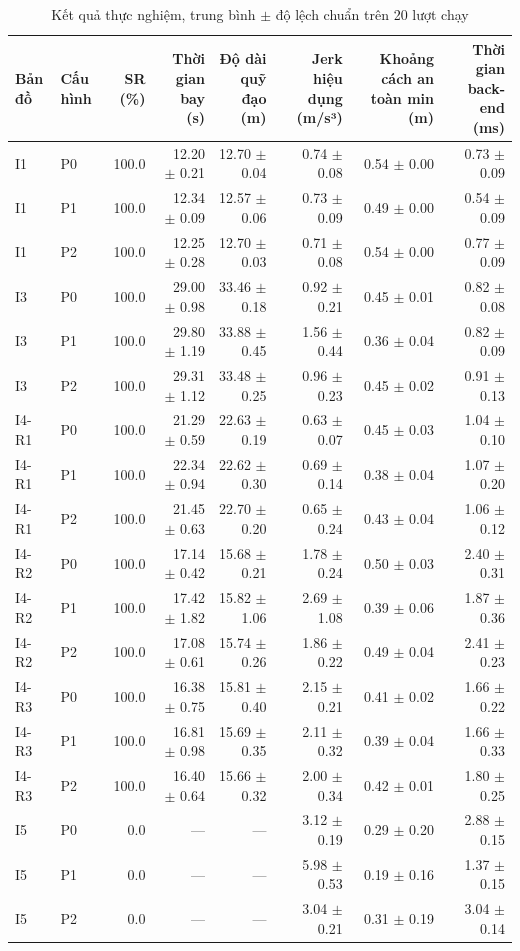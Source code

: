 \begin{table}[htbp]
\centering
\caption{Kết quả thực nghiệm, trung bình $\pm$ độ lệch chuẩn trên 20 lượt chạy}
\label{tab:ket-qua}
\begin{tabular}{llrrrrrr}
\hline
Bản đồ & Cấu hình & SR (\%) & Thời gian bay (s) & Độ dài quỹ đạo (m) & Jerk hiệu dụng (m/s³) & Khoảng cách an toàn min (m) & Thời gian back-end (ms) \\
\hline
I1 & P0 & 100.0 & 12.20 $\pm$ 0.21 & 12.70 $\pm$ 0.04 & 0.74 $\pm$ 0.08 & 0.54 $\pm$ 0.00 & 0.73 $\pm$ 0.09 \\
I1 & P1 & 100.0 & 12.34 $\pm$ 0.09 & 12.57 $\pm$ 0.06 & 0.73 $\pm$ 0.09 & 0.49 $\pm$ 0.00 & 0.54 $\pm$ 0.09 \\
I1 & P2 & 100.0 & 12.25 $\pm$ 0.28 & 12.70 $\pm$ 0.03 & 0.71 $\pm$ 0.08 & 0.54 $\pm$ 0.00 & 0.77 $\pm$ 0.09 \\
I3 & P0 & 100.0 & 29.00 $\pm$ 0.98 & 33.46 $\pm$ 0.18 & 0.92 $\pm$ 0.21 & 0.45 $\pm$ 0.01 & 0.82 $\pm$ 0.08 \\
I3 & P1 & 100.0 & 29.80 $\pm$ 1.19 & 33.88 $\pm$ 0.45 & 1.56 $\pm$ 0.44 & 0.36 $\pm$ 0.04 & 0.82 $\pm$ 0.09 \\
I3 & P2 & 100.0 & 29.31 $\pm$ 1.12 & 33.48 $\pm$ 0.25 & 0.96 $\pm$ 0.23 & 0.45 $\pm$ 0.02 & 0.91 $\pm$ 0.13 \\
I4-R1 & P0 & 100.0 & 21.29 $\pm$ 0.59 & 22.63 $\pm$ 0.19 & 0.63 $\pm$ 0.07 & 0.45 $\pm$ 0.03 & 1.04 $\pm$ 0.10 \\
I4-R1 & P1 & 100.0 & 22.34 $\pm$ 0.94 & 22.62 $\pm$ 0.30 & 0.69 $\pm$ 0.14 & 0.38 $\pm$ 0.04 & 1.07 $\pm$ 0.20 \\
I4-R1 & P2 & 100.0 & 21.45 $\pm$ 0.63 & 22.70 $\pm$ 0.20 & 0.65 $\pm$ 0.24 & 0.43 $\pm$ 0.04 & 1.06 $\pm$ 0.12 \\
I4-R2 & P0 & 100.0 & 17.14 $\pm$ 0.42 & 15.68 $\pm$ 0.21 & 1.78 $\pm$ 0.24 & 0.50 $\pm$ 0.03 & 2.40 $\pm$ 0.31 \\
I4-R2 & P1 & 100.0 & 17.42 $\pm$ 1.82 & 15.82 $\pm$ 1.06 & 2.69 $\pm$ 1.08 & 0.39 $\pm$ 0.06 & 1.87 $\pm$ 0.36 \\
I4-R2 & P2 & 100.0 & 17.08 $\pm$ 0.61 & 15.74 $\pm$ 0.26 & 1.86 $\pm$ 0.22 & 0.49 $\pm$ 0.04 & 2.41 $\pm$ 0.23 \\
I4-R3 & P0 & 100.0 & 16.38 $\pm$ 0.75 & 15.81 $\pm$ 0.40 & 2.15 $\pm$ 0.21 & 0.41 $\pm$ 0.02 & 1.66 $\pm$ 0.22 \\
I4-R3 & P1 & 100.0 & 16.81 $\pm$ 0.98 & 15.69 $\pm$ 0.35 & 2.11 $\pm$ 0.32 & 0.39 $\pm$ 0.04 & 1.66 $\pm$ 0.33 \\
I4-R3 & P2 & 100.0 & 16.40 $\pm$ 0.64 & 15.66 $\pm$ 0.32 & 2.00 $\pm$ 0.34 & 0.42 $\pm$ 0.01 & 1.80 $\pm$ 0.25 \\
I5 & P0 & 0.0 & — & — & 3.12 $\pm$ 0.19 & 0.29 $\pm$ 0.20 & 2.88 $\pm$ 0.15 \\
I5 & P1 & 0.0 & — & — & 5.98 $\pm$ 0.53 & 0.19 $\pm$ 0.16 & 1.37 $\pm$ 0.15 \\
I5 & P2 & 0.0 & — & — & 3.04 $\pm$ 0.21 & 0.31 $\pm$ 0.19 & 3.04 $\pm$ 0.14 \\
\hline
\end{tabular}
\end{table}
